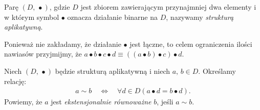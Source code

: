 \begin{definicja}
Parę \((D,\, \bullet)\), gdzie \(D\) jest zbiorem zawierającym przynajmniej dwa elementy i w którym symbol \(\bullet\) oznacza działanie binarne na \(D\), nazywamy \emph{strukturą aplikatywną}.
\end{definicja}
\begin{konwencja*}
  Ponieważ nie zakładamy, że działanie \(\bullet\) jest łączne, to celem ograniczenia ilości nawiasów przyjmijmy, że \(a\bullet b\bullet c\bullet d \equiv \left(\left(a\bullet b\right)\bullet c\right)\bullet d\).
\begin{definicja}%
Niech \((D,\,\bullet)\) będzie strukturą aplikatywną i niech \(a,\,b\in D\). Określamy relację: 
\begin{align*}
a \sim b \quad \Leftrightarrow\quad \forall d \in D \left(a \bullet d = b \bullet d\right).
\end{align*}
Powiemy, że \(a\) jest \emph{ekstensjonalnie równoważne} \(b\), jeśli \(a\sim b\).
\end{definicja}

\end{konwencja*}

